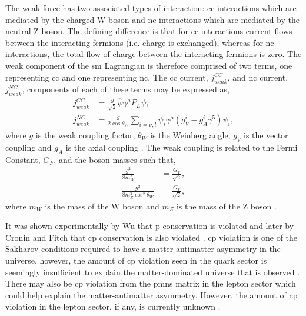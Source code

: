 The weak force has two associated types of interaction: \gls{cc} interactions which are mediated by the charged W boson and \gls{nc} interactions which are mediated by the neutral Z boson. The defining difference is that for \gls{cc} interactions current flows between the interacting fermions (i.e. charge is exchanged), whereas for \gls{nc} interactions, the total flow of charge between the interacting fermions is zero. The weak component of the \gls{sm} Lagrangian is therefore comprised of two terms, one representing \gls{cc} and one representing \gls{nc}. The \gls{cc} current, $j^{CC}_{weak}$,  and \gls{nc} current, $j^{NC}_{weak}$, components of each of these terms may be expressed as, 
\begin{equation}\label{eqn:weak current}
\begin{split}
    j^{CC}_{weak} &= \frac{g}{\sqrt{2}}\overline{\psi}\gamma^{\mu}P_L\psi, \\
    j^{NC}_{weak} &= \frac{g}{2\cos{\theta_W}}\sum_{i = \nu, l}
    \overline{\psi}_i \gamma^\mu (g_V^i - g_A^i \gamma^5)\psi_i, 
\end{split}
\end{equation}
where $g$ is the weak coupling factor, $\theta_W$ is the Weinberg angle, $g_V$ is the vector coupling and $g_A$ is the axial coupling \cite{Particles_and_Fundamental_Interactions:_An_Introduction_to_Particle_Physics}\cite{Fundamentals_of_Neutrino_Physics_and_Astrophysics}\cite{PDG_2022}. The weak coupling is related to the Fermi Constant, $G_F$, and the boson masses such that,
\begin{equation}
\begin{split}
    \frac{g^2}{8m^2_W} &= \frac{G_F}{\sqrt{2}}, \\
    \frac{g^2}{8m^2_Z\cos^2{\theta_W}} &= \frac{G_F}{\sqrt{2}},
\end{split}
\end{equation}
where $m_W$ is the mass of the W boson and $m_Z$ is the mass of the Z boson \cite{Fundamentals_of_Neutrino_Physics_and_Astrophysics}.

It was shown experimentally by Wu that \gls{p} conservation is violated and later by Cronin and Fitch that \gls{cp} conservation is also violated \cite{Wu_experiment}\cite{Cronin_and_Fitch_experiment}. \gls{cp} violation is one of the Sakharov conditions required to have a matter-antimatter asymmetry in the universe, however, the amount of \gls{cp} violation seen in the quark sector is seemingly insufficient to explain the matter-dominated universe that is observed \cite{Sakharov_conditions}. There may also be \gls{cp} violation from the \gls{pmns} matrix in the lepton sector which could help explain the matter-antimatter asymmetry. However, the amount of \gls{cp} violation in the lepton sector, if any, is currently unknown \cite{leptonic_cp_violation}.  


